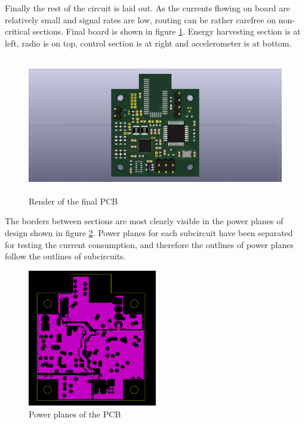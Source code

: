 Finally the rest of the circuit is laid out. As the currents flowing on board are relatively small and signal rates are low, routing can be rather carefree on non-critical sections. Final board is shown in figure \ref{fig:pcb_render}. Energy harvesting section is at left, radio is on top, control section is at right and accelerometer is at bottom. 

\begin{figure}[htb]
  \begin{center}
    \includegraphics[height=6cm]{images/own_dwg/circuit/render.jpg}
  \end{center}
  \caption{\label{fig:pcb_render} Render of the final PCB}
\end{figure}

The borders between sections are most clearly visible in the power planes of design shown in figure \ref{fig:pcb_planes}. Power planes for each subcircuit have been separated for testing the current consumption, and therefore the outlines of power planes follow the outlines of subcircuits.

\begin{figure}[htb]
  \begin{center}
    \includegraphics[height=6cm]{images/own_dwg/circuit/powerplane.jpg}
  \end{center}
  \caption{\label{fig:pcb_planes} Power planes of the PCB}
\end{figure}

